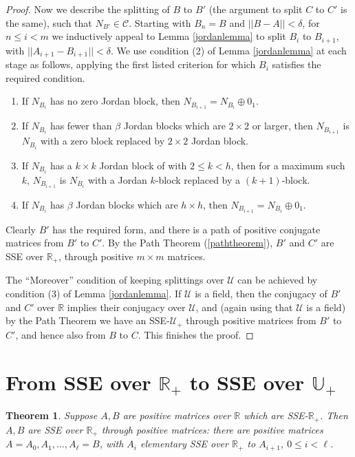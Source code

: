 \documentclass{amsart}
\newtheorem{theorem}{Theorem}[section]
\theoremstyle{definition}
\theoremstyle{remark}
\numberwithin{equation}{section}
\begin{document}
{{\begin{proof}
Now we describe the splitting of $B$ to $B'$ 
(the argument to split $C$ to $C'$ is the same), 
such that $N_{B'}\in \mathcal C$. 
Starting with $B_n=B$ and $||B-A||<\delta$, 
for $n\leq i <m$ we inductively appeal to 
Lemma \ref{jordanlemma} to split $B_i$ to 
$B_{i+1}$, with $||A_{i+1}-B_{i+1}||<\delta $. 
We use condition (2) of
Lemma \ref{jordanlemma} at each stage as 
follows, applying the first listed criterion 
for which $B_i$ satisfies the required 
condition. 
\begin{enumerate} 
\item 
If $N_{B_i}$ has no zero Jordan block, 
then  $N_{B_{i+1}}=N_{B_i}\oplus 0_1$. 
\item 
If $N_{B_i}$ has fewer than $\beta $ 
Jordan blocks which are $2\times 2$ or larger, 
then 
$N_{B_{i+1}}$ is $ N_{B_i}$
with  a zero block 
replaced by $2\times 2$ Jordan block. 
\item 
If 
$N_{B_i}$ has 
 a $k\times k$ Jordan block of 
 with $2\leq k<h$, 
then for a maximum such $k$, 
$N_{B_{i+1}}$ is $ N_{B_i}$
with  a Jordan $k$-block 
replaced by a $(k+1)$-block. 
\item 
If $N_{B_i}$ has $\beta $ 
 Jordan blocks which are $h\times h$, 
then $N_{B_{i+1}}=N_{B_i}\oplus 0_1$. 
\end{enumerate} 
Clearly $B'$ has the required form, and there is a 
path of positive conjugate matrices from $B'$ to $C'$. 
 By the Path Theorem (\ref{paththeorem}),
$B'$ and $C'$ are SSE over $\mathbb R_+$, through 
positive $m\times m$ matrices. 

The ``Moreover'' condition of keeping splittings over 
$\mathcal U$ can be achieved by condition (3) 
of Lemma \ref{jordanlemma}. 
If $\mathcal U$ is a field, then the conjugacy of $B'$ and $C'$ over 
$\mathbb R$ implies their conjugacy over 
$\mathcal U$, and (again using that $\mathcal U$ 
is a field) by the Path Theorem we have an SSE-$\mathcal U_+$ 
through positive matrices from $B'$ to $C'$, and 
hence also from $B$ to $C$. This finishes the proof. 
\end{proof} 

\section{From SSE over $\mathbb R_+$ 
to SSE over $\mathbb U_+$} 
\label{sseoverplus}

\begin{theorem} \label{positivetheorem}
Suppose $A,B$ are positive matrices over $\mathbb R$ which 
are SSE-$\mathbb R_+$. Then 
$A,B$ are SSE over $\mathbb R_+$ through positive matrices: 
there are positive 
matrices  $A=A_0,A_1, \dots , A_{\ell}=B$, with 
$A_i$ elementary SSE over $\mathbb R_+$ to $A_{i+1}$, $0\leq i < \ell$. 
\end{theorem} 

}}
\end{document}
